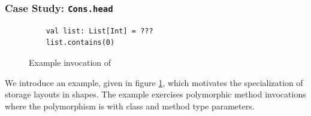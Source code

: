 \subsubsection*{Case Study: \texttt{Cons.head}}

\begin{figure}[!htb]
	\begin{verbatim}
	val list: List[Int] = ???
	list.contains(0)
	\end{verbatim}
	\caption{Example invocation of }
	\label{example:list-contains-example}
\end{figure}

We introduce an example, given in figure \ref{example:list-contains-example}, which motivates the specialization of storage layouts in shapes.
The example exercises polymorphic method invocations where the polymorphism is with class and method type parameters.

